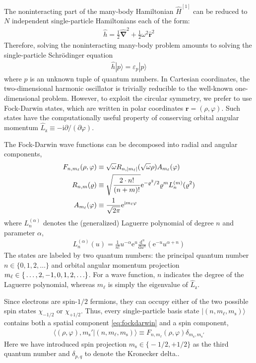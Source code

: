 The noninteracting part of the many-body Hamiltonian $\hat{H}^{[1]}$ can be reduced to $N$ independent single-particle Hamiltonians each of the form:
\begin{align*}
  \hat{h} = \frac{1}{2} \hat{\bm{\nabla}}^2 + \frac{1}{2} \omega^2 \hat{\bm{r}}^2
\end{align*}
Therefore, solving the noninteracting many-body problem amounts to solving the single-particle Schr\"odinger equation
\begin{align*}
  \hat{h} |p\rangle = \varepsilon_p |p\rangle
\end{align*}
where $p$ is an unknown tuple of quantum numbers.  In Cartesian coordinates, the two-dimensional harmonic oscillator is trivially reducible to the well-known one-dimensional problem.  However, to exploit the circular symmetry, we prefer to use Fock-Darwin states, which are written in polar coordinates $\bm{r} = (\rho, \varphi)$.  Such states have the computationally useful property of conserving orbital angular momentum $\hat{L}_{\mathrm{z}} \equiv -\mathrm{i} \partial / (\partial \varphi)$.

The Fock-Darwin wave functions can be decomposed into radial and angular components,\cite[Appx.\ A]{lohne2010coupled}
\begin{align}
  F_{n, m_\ell}(\rho, \varphi) &\equiv \sqrt\omega R_{n, |m_\ell|}(\sqrt \omega \rho) A_{m_\ell}(\varphi) \label{eq:fockdarwin} \\
  R_{n, m}(\varrho) &\equiv \sqrt{\frac{2 \cdot n!}{(n + m)!}} \mathrm{e}^{-\varrho^2 / 2} \varrho^m L_n^{(m)}(\varrho^2) \notag \\
  A_{m_\ell}(\varphi) &\equiv \frac{1}{\sqrt{2 \pi}} \mathrm{e}^{\mathrm{i} m_\ell \varphi} \notag
\end{align}
where $L_n^{(\alpha)}$ denotes the (generalized) Laguerre polynomial \cite[\S 18.3]{NIST:DLMF} of degree $n$ and parameter $\alpha$,
\begin{align*}
  L_n^{(\alpha)}(u) = \frac{1}{n!} u^{-\alpha} \mathrm{e}^u \frac{\mathrm{d}^n}{\mathrm{d} u^n} (\mathrm{e}^{-u} u^{\alpha + n})
\end{align*}
The states are labeled by two quantum numbers: the principal quantum number $n \in \{0, 1, 2, \ldots\}$ and orbital angular momentum projection $m_\ell \in \mathbb \{\ldots, 2, -1, 0, 1, 2, \ldots\}$.  For a wave function, $n$ indicates the degree of the Laguerre polynomial, whereas $m_\ell$ is simply the eigenvalue of $\hat{L}_{\mathrm{z}}$.

Since electrons are spin-$1/2$ fermions, they can occupy either of the two possible spin states $\chi_{-1/2}$ or $\chi_{+1/2}$.  Thus, every single-particle basis state $| (n, m_\ell, m_{\mathrm{s}}) \rangle$ contains both a spatial component \eqref{eq:fockdarwin} and a spin component,
\begin{align} \label{eq:singleparticlestate}
  \langle (\rho, \varphi), m_{\mathrm{s}}' | (n, m_\ell, m_{\mathrm{s}}) \rangle \equiv F_{n, m_\ell}(\rho, \varphi) \delta_{m_{\mathrm{s}}^{}, m_{\mathrm{s}}'}
\end{align}
Here we have introduced spin projection $m_{\mathrm{s}} \in \bigl\{-1/2, +1/2\bigr\}$ as the third quantum number and $\delta_{p, q}$ to denote the Kronecker delta..

